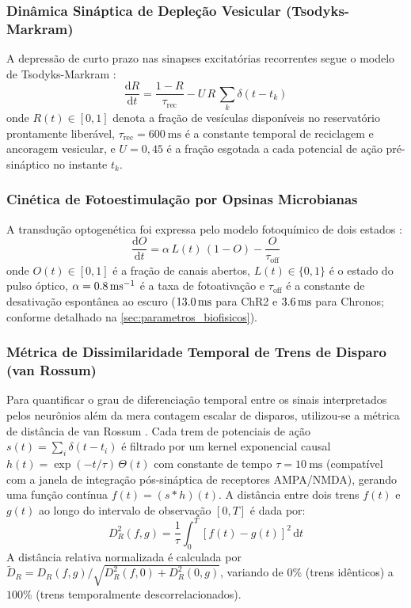 \documentclass[11pt,a4paper,article,brazil]{abntex2}
\begin{document}
\subsubsection{Dinâmica Sináptica de Depleção Vesicular (Tsodyks-Markram)}
A depressão de curto prazo nas sinapses excitatórias recorrentes segue o modelo de Tsodyks-Markram \cite{tsodyks1998}:
\begin{equation}
    \frac{\mathrm{d}R}{\mathrm{d}t} = \frac{1 - R}{\tau_{\text{rec}}} - U\,R\,\sum_{k} \delta(t - t_k)
\end{equation}
onde $R(t) \in [0, 1]$ denota a fração de vesículas disponíveis no reservatório prontamente liberável, $\tau_{\text{rec}} = \qty{600}{\milli\second}$ é a constante temporal de reciclagem e ancoragem vesicular, e $U = 0{,}45$ é a fração esgotada a cada potencial de ação pré-sináptico no instante $t_k$.

\subsubsection{Cinética de Fotoestimulação por Opsinas Microbianas}
A transdução optogenética foi expressa pelo modelo fotoquímico de dois estados \cite{nikolic2009, grossman2011}:
\begin{equation}
    \frac{\mathrm{d}O}{\mathrm{d}t} = \alpha\,L(t)\,(1 - O) - \frac{O}{\tau_{\text{off}}}
\end{equation}
onde $O(t) \in [0, 1]$ é a fração de canais abertos, $L(t) \in \{0, 1\}$ é o estado do pulso óptico, $\alpha = \qty{0{,}8}{\per\milli\second}$ é a taxa de fotoativação e $\tau_{\text{off}}$ é a constante de desativação espontânea ao escuro ($\qty{13{,}0}{\milli\second}$ para ChR2 e $\qty{3{,}6}{\milli\second}$ para Chronos; conforme detalhado na \cref{sec:parametros_biofisicos}).

\subsubsection{Métrica de Dissimilaridade Temporal de Trens de Disparo (van Rossum)}
Para quantificar o grau de diferenciação temporal entre os sinais interpretados pelos neurônios além da mera contagem escalar de disparos, utilizou-se a métrica de distância de van Rossum \cite{vanrossum2001}. Cada trem de potenciais de ação $s(t) = \sum_i \delta(t - t_i)$ é filtrado por um kernel exponencial causal $h(t) = \exp(-t/\tau)\,\Theta(t)$ com constante de tempo $\tau = \qty{10}{\milli\second}$ (compatível com a janela de integração pós-sináptica de receptores AMPA/NMDA), gerando uma função contínua $f(t) = (s * h)(t)$. A distância entre dois trens $f(t)$ e $g(t)$ ao longo do intervalo de observação $[0, T]$ é dada por:
\begin{equation}
    D_R^2(f, g) = \frac{1}{\tau} \int_0^T [f(t) - g(t)]^2\,\mathrm{d}t
\end{equation}
A distância relativa normalizada é calculada por $\tilde{D}_R = D_R(f, g) / \sqrt{D_R^2(f, 0) + D_R^2(0, g)}$, variando de $0\%$ (trens idênticos) a $100\%$ (trens temporalmente descorrelacionados).
\end{document}
